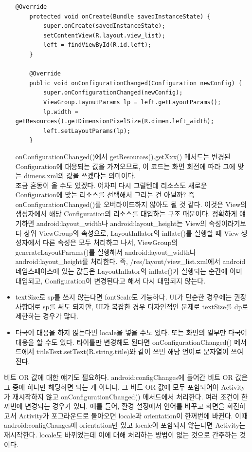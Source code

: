\begin{itemize}
\begin{lstlisting}[frame=single]
	@Override
	protected void onCreate(Bundle savedInstanceState) {
		super.onCreate(savedInstanceState);
		setContentView(R.layout.view_list);
		left = findViewById(R.id.left);
	}

	@Override
	public void onConfigurationChanged(Configuration newConfig) {
		super.onConfigurationChanged(newConfig);
		ViewGroup.LayoutParams lp = left.getLayoutParams();
		lp.width = getResources().getDimensionPixelSize(R.dimen.left_width);
		left.setLayoutParams(lp);
	}
\end{lstlisting}
onConfigurationChanged()에서 getResources().getXxx() 메서드는 변경된 Configuration에 대응되는 값을 가져오므로, 이 코드는 화면 회전에 따라 그에 맞는 dimens.xml의 값을 쓰겠다는 의미이다.\\

조금 혼동이 올 수도 있겠다. 어차피 다시 그릴텐데 리소스도 새로운 Configuration에 맞는 리소스를 선택해서 그리는 건 아닐까? 
즉 onConfigurationChanged()를 오버라이드하지 않아도 될 것 같다.
이것은 View의 생성자에서 해당 Configuration의 리소스를 대입하는 구조 때문이다. 정확하게 얘기하면 android:layout\_width나 android:layout\_height는 View의 속성이라기보다 상위 ViewGroup의 속성으로, LayoutInflator의 inflate()를 실행할 때 View 생성자에서 다른 속성은 모두 처리하고 나서, ViewGroup의 generateLayoutParams()를 실행해서 android:layout\_width나 android:layout\_height를 처리한다.
즉, /res/layout/view\_list.xml에서 android 네임스페이스에 있는 값들은 LayoutInflator의 inflate()가 실행되는 순간에 이미 대입되고, Configuration이 변경된다고 해서 다시 대입되지 않는다. 
	
\item textSize로 sp를 쓰지 않는다면 fontScale도 가능하다. UI가 단순한 경우에는 권장사항대로 sp를 써도 되지만, UI가 복잡한 경우 디자인적인 문제로 textSize를 dp로 제한하는 경우가 많다.

\item 다국어 대응을 하지 않는다면 locale을 넣을 수도 있다. 또는 화면의 일부만 다국어 대응을 할 수도 있다. 타이틀만 변경해도 된다면 onConfigurationChanged() 메서드에서 titleText.setText(R.string.title)와 같이 쓰면 해당 언어로 문자열이 쓰여진다.
\end{itemize}

비트 OR 값에 대한 얘기도 필요하다. android:configChanges에 들어간 비트 OR 값은 그 중에 하나만 해당하면 되는 게 아니다. 그 비트 OR 값에 모두 포함되어야 Activity가 재시작하지 않고 onConfigurationChanged() 메서드에서 처리한다. 
여러 조건이 한꺼번에 변경되는 경우가 있다. 
예를 들어, 환경 설정에서 언어를 바꾸고 화면을 회전하고서 Activity가 포그라운드로 돌아오면 locale과 orientation이 한꺼번에 바뀐다. 이때 android:configChanges에 orientation만 있고 locale이 포함되지 않는다면 Activity는 재시작한다. locale도 바뀌었는데 이에 대해 처리하는 방법이 없는 것으로 간주하는 것이다.\\

